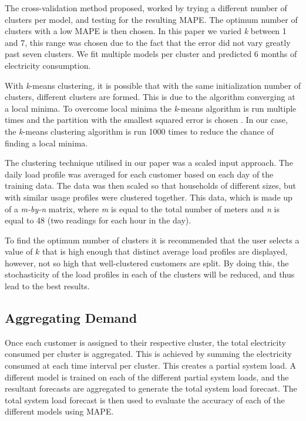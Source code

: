 The cross-validation method proposed, worked by trying a different number of clusters per model, and testing for the resulting MAPE. The optimum number of clusters with a low MAPE is then chosen. In this paper we varied \textit{k} between 1 and 7, this range was chosen due to the fact that the error did not vary greatly past seven clusters. We fit multiple models per cluster and predicted 6 months of electricity consumption.

With \textit{k}-means clustering, it is possible that with the same initialization number of clusters, different clusters are formed. This is due to the algorithm converging at a local minima. To overcome local minima the \textit{k}-means algorithm is run multiple times and the partition with the smallest squared error is chosen \cite{Jain2010}. In our case, the \textit{k}-means clustering algorithm is run 1000 times to reduce the chance of finding a local minima. 

The clustering technique utilised in our paper was a scaled input approach. The daily load profile was averaged for each customer based on each day of the training data. The data was then scaled so that households of different sizes, but with similar usage profiles were clustered together. This data, which is made up of a \textit{m-by-n} matrix, where \textit{m} is equal to the total number of meters and \textit{n} is equal to 48 (two readings for each hour in the day).

To find the optimum number of clusters it is recommended that the user selects a value of $k$ that is high enough that distinct average load profiles are displayed, however, not so high that well-clustered customers are split. By doing this, the stochasticity of the load profiles in each of the clusters will be reduced, and thus lead to the best results.


\subsection{Aggregating Demand}

Once each customer is assigned to their respective cluster, the total electricity consumed per cluster is aggregated. This is achieved by summing the electricity consumed at each time interval per cluster. This creates a partial system load. A different model is trained on each of the different partial system loads, and the resultant forecasts are aggregated to generate the total system load forecast. The total system load forecast is then used to evaluate the accuracy of each of the different models using MAPE. 


